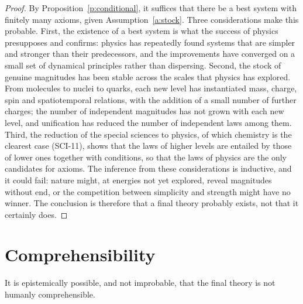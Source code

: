 \documentclass{situationist-preprint}
\begin{document}
\begin{proof}
By Proposition~\ref{p:conditional}, it suffices that there be a best system with finitely many axioms, given Assumption~\ref{a:stock}. Three considerations make this probable. First, the existence of a best system is what the success of physics presupposes and confirms: physics has repeatedly found systems that are simpler and stronger than their predecessors, and the improvements have converged on a small set of dynamical principles rather than dispersing. Second, the stock of genuine magnitudes has been stable across the scales that physics has explored. From molecules to nuclei to quarks, each new level has instantiated mass, charge, spin and spatiotemporal relations, with the addition of a small number of further charges; the number of independent magnitudes has not grown with each new level, and unification has reduced the number of independent laws among them. Third, the reduction of the special sciences to physics, of which chemistry is the clearest case (SCI-11), shows that the laws of higher levels are entailed by those of lower ones together with conditions, so that the laws of physics are the only candidates for axioms. The inference from these considerations is inductive, and it could fail: nature might, at energies not yet explored, reveal magnitudes without end, or the competition between simplicity and strength might have no winner. The conclusion is therefore that a final theory probably exists, not that it certainly does.
\end{proof}

\section{Comprehensibility}

\begin{proposition}\label{p:comprehension}
It is epistemically possible, and not improbable, that the final theory is not humanly comprehensible.
\end{proposition}
\end{document}
